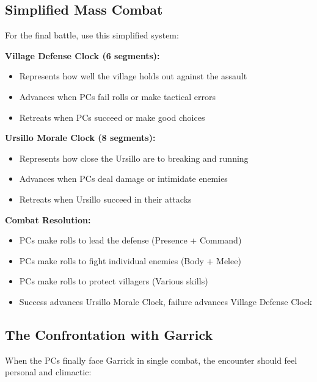 \documentclass[11pt]{article}
\begin{document}
\subsection{Simplified Mass Combat}

For the final battle, use this simplified system:

\textbf{Village Defense Clock (6 segments):}
\begin{itemize}
\item Represents how well the village holds out against the assault
\item Advances when PCs fail rolls or make tactical errors
\item Retreats when PCs succeed or make good choices
\end{itemize}

\textbf{Ursillo Morale Clock (8 segments):}
\begin{itemize}
\item Represents how close the Ursillo are to breaking and running
\item Advances when PCs deal damage or intimidate enemies
\item Retreats when Ursillo succeed in their attacks
\end{itemize}

\textbf{Combat Resolution:}
\begin{itemize}
\item PCs make rolls to lead the defense (Presence + Command)
\item PCs make rolls to fight individual enemies (Body + Melee)
\item PCs make rolls to protect villagers (Various skills)
\item Success advances Ursillo Morale Clock, failure advances Village Defense Clock
\end{itemize}

\subsection{The Confrontation with Garrick}

When the PCs finally face Garrick in single combat, the encounter should feel personal and climactic:
\end{document}
